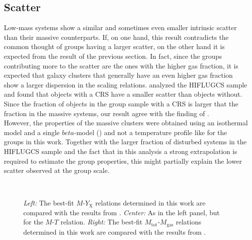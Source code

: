\documentclass{aa} %
\begin{document}
\subsection{Scatter}
Low-mass systems show a similar and sometimes even smaller
intrinsic scatter than their massive counterparts. If, on one hand, this
result contradicts the common thought of groups having a larger
scatter, on the other hand it is expected from the result of the
previous section. In fact, since the groups contributing more to the
scatter are the ones with the higher gas fraction, it is expected
that galaxy clusters that generally have an even higher gas fraction
show a larger dispersion in the scaling
relations. \citet{2011A&A...532A.133M} analyzed the HIFLUGCS sample
and found that objects with a CRS have a smaller scatter than objects
without. Since the fraction of objects in the group sample with a CRS
is larger that the fraction in the massive systems, our result 
agree with the finding of \citet{2011A&A...532A.133M}.\\
However, the properties of the massive clusters
were obtained using an isothermal model and a single $beta$-model
(\citealt{2002ApJ...567..716R}) and not a temperature profile like for
the groups in this work. Together with the larger fraction of
disturbed systems in the HIFLUGCS sample and the fact that in this
analysis a strong extrapolation is required to estimate the group properties, this might partially explain the lower scatter observed at the group scale.

\begin{figure*}[!t]
\begin{center}
\hbox{
}
\end{center}
\caption{{\it Left:} The best-fit $M$-$Y_{\text{X}}$ relations determined in this work are compared with the results from \citet{2010MNRAS.408.2213S}. {\it Center:} As in the left panel, but for the $M$-$T$ relation.  {\it Right:} The best-fit $M_{\text{tot}}$-$M_{\text{gas}}$ relations determined in this work are compared with the results from \citet{2010MNRAS.401.1670F}.}
\label{fig:sim}
\end{figure*}
\end{document}
